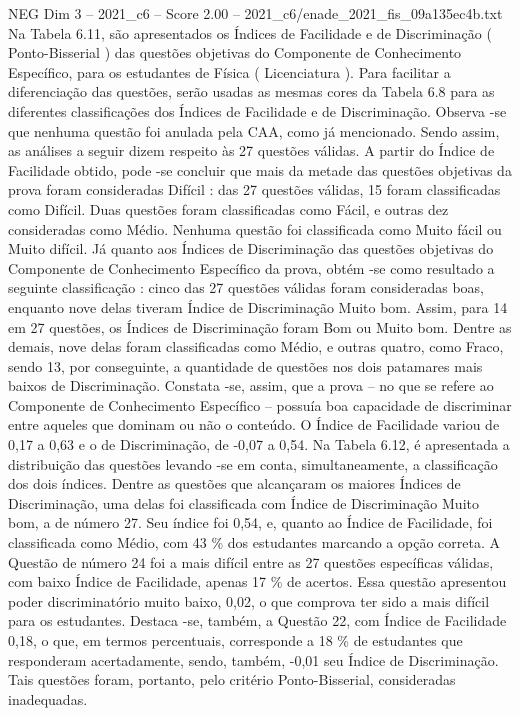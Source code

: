\begin{textsample}{NEG Dim 3 – 2021\_c6 – Score 2.00 – 2021\_c6/enade\_2021\_fis\_09a135ec4b.txt}
Na Tabela 6.11, são apresentados os Índices de Facilidade e de Discriminação ( Ponto-Bisserial ) das questões objetivas do Componente de Conhecimento Específico, para os estudantes de Física ( Licenciatura ).
Para facilitar a diferenciação das questões, serão usadas as mesmas cores da Tabela 6.8 para as diferentes classificações dos Índices de Facilidade e de Discriminação.
Observa -se que nenhuma questão foi anulada pela CAA, como já mencionado.
Sendo assim, as análises a seguir dizem respeito às 27 questões válidas.
A partir do Índice de Facilidade obtido, pode -se concluir que mais da metade das questões objetivas da prova foram consideradas Difícil : das 27 questões válidas, 15 foram classificadas como Difícil.
Duas questões foram classificadas como Fácil, e outras dez consideradas como Médio.
Nenhuma questão foi classificada como Muito fácil ou Muito difícil.
Já quanto aos Índices de Discriminação das questões objetivas do Componente de Conhecimento Específico da prova, obtém -se como resultado a seguinte classificação : cinco das 27 questões válidas foram consideradas boas, enquanto nove delas tiveram Índice de Discriminação Muito bom.
Assim, para 14 em 27 questões, os Índices de Discriminação foram Bom ou Muito bom.
Dentre as demais, nove delas foram classificadas como Médio, e outras quatro, como Fraco, sendo 13, por conseguinte, a quantidade de questões nos dois patamares mais baixos de Discriminação.
Constata -se, assim, que a prova – no que se refere ao Componente de Conhecimento Específico – possuía boa capacidade de discriminar entre aqueles que dominam ou não o conteúdo.
O Índice de Facilidade variou de 0,17 a 0,63 e o de Discriminação, de -0,07 a 0,54.
Na Tabela 6.12, é apresentada a distribuição das questões levando -se em conta, simultaneamente, a classificação dos dois índices.
Dentre as questões que alcançaram os maiores Índices de Discriminação, uma delas foi classificada com Índice de Discriminação Muito bom, a de número 27.
Seu índice foi 0,54, e, quanto ao Índice de Facilidade, foi classificada como Médio, com 43 \% dos estudantes marcando a opção correta.
A Questão de número 24 foi a mais difícil entre as 27 questões específicas válidas, com baixo Índice de Facilidade, apenas 17 \% de acertos.
Essa questão apresentou poder discriminatório muito baixo, 0,02, o que comprova ter sido a mais difícil para os estudantes.
Destaca -se, também, a Questão 22, com Índice de Facilidade 0,18, o que, em termos percentuais, corresponde a 18 \% de estudantes que responderam acertadamente, sendo, também, -0,01 seu Índice de Discriminação.
Tais questões foram, portanto, pelo critério Ponto-Bisserial, consideradas inadequadas.

\end{textsample}

